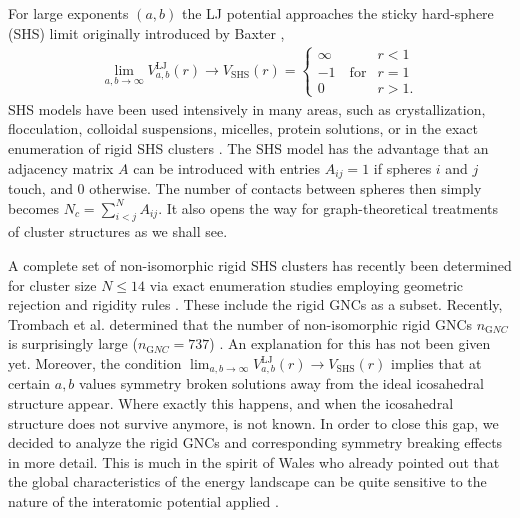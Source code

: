 For large exponents $(a,b)$ the LJ potential approaches the sticky hard-sphere
(SHS) limit originally introduced by Baxter \autocite{baxter68,Gazzillo_AnalyticsolutionsBaxter_2004},
\begin{align}
    \lim_{a,b\rightarrow \infty} V_{a,b}^\mathrm{LJ}(r) \rightarrow V_\mathrm{SHS}(r)=
    \begin{cases}
        \infty   & r < 1\\
        -1  \quad \mathrm{for} & r = 1\\
        0       & r > 1.
    \end{cases}
\label{eqn:KS1}
\end{align}
SHS models have been used intensively in many areas, such as crystallization,
flocculation, colloidal suspensions, micelles, protein solutions, or in the
exact enumeration of rigid SHS clusters
\autocite{Stell_Stickyspheresrelated_1991,Jamnik_Spatialcorrelationssolvation_1996,Santos_Radialdistributionfunctions_1998,Gazzillo_AnalyticsolutionsBaxter_2004,Hoy_MinimalEnergyPackings_2010,Arkus_Minimalenergyclusters_2009,Arkus-2010,Arkus_DerivingFiniteSphere_2011,Hoy_Structurefinitesphere_2012,Hayes_ScienceStickySpheres_2012,Holmes-Cerfon_geometricalapproachcomputing_2013,Holmes-Cerfon_EnumeratingRigidSphere_2016,Holmes-Cerfon_StickySphereClusters_2017,Kallus_Freeenergysingular_2017}.
The SHS model has the advantage that an adjacency matrix $A$ can be introduced
with entries $A_{ij}=1$ if spheres $i$ and $j$ touch, and 0 otherwise. The
number of contacts between spheres then simply becomes $N_c=\sum_{i<j}^N
A_{ij}$. It also opens the way for graph-theoretical treatments of cluster
structures as we shall see.

A complete set of non-isomorphic rigid SHS clusters has recently been
determined for cluster size $N \leq 14$ via exact enumeration studies employing
geometric rejection
\autocite{Hoy_Structuredynamicsmodel_2015,Holmes-Cerfon_EnumeratingRigidSphere_2016}
and rigidity rules \autocite{Holmes-Cerfon_StickySphereClusters_2017}. These
include the rigid \acp{GNC} as a subset. Recently, Trombach et al. determined
that the number of non-isomorphic rigid \acp{GNC} $n_{\mathrm GNC}$ is
surprisingly large ($n_{\mathrm GNC}=737$) \autocite{Trombach_stickyhardsphereLennardJonestypeclusters_2018}. An explanation for
this has not been given yet. Moreover, the condition $\lim_{a,b\rightarrow
\infty} V_{a,b}^\mathrm{LJ}(r) \rightarrow V_\mathrm{SHS}(r)$ implies that at
certain $a,b$ values symmetry broken solutions away from the ideal icosahedral
structure appear. Where exactly this happens, and when the icosahedral
structure does not survive anymore, is not known. In order to close this gap,
we decided to analyze the rigid \acp{GNC} and corresponding symmetry breaking
effects in more detail. This is much in the spirit of Wales who already pointed
out that the global characteristics of the energy landscape can be quite
sensitive to the nature of the interatomic potential applied
\autocite{Wales_MicroscopicBasisGlobal_2001}.


